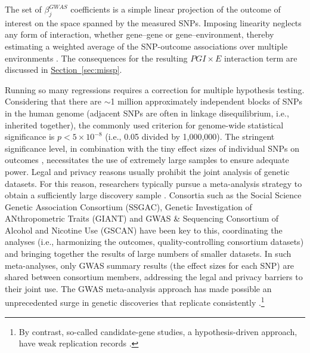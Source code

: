 \documentclass[12pt,a4paper]{article}
\begin{document}
\begin{bibunit}
The set of $\beta_j^{GWAS}$ coefficients is a simple linear projection of the outcome of interest on the space spanned by the measured SNPs. Imposing linearity neglects any form of interaction, whether gene--gene or gene--environment, thereby estimating a weighted average of the SNP-outcome associations over multiple environments \citep[e.g.,][]{loken2012linear}. The consequences for the resulting $PGI \times E$ interaction term are discussed in \hyperref[sec:missp]{Section~\ref*{sec:missp}}.

Running so many regressions requires a correction for multiple hypothesis testing. Considering that there are $\sim$1 million approximately independent blocks of SNPs in the human genome (adjacent SNPs are often in linkage disequilibrium, i.e., inherited together), the commonly used criterion for genome-wide statistical significance is $p <5 \times 10^{-8}$ (i.e., 0.05 divided by 1,000,000). The stringent significance level, in combination with the tiny effect sizes of individual SNPs on outcomes \citep{Rietveld2013,Chabris2015}, necessitates the use of extremely large samples to ensure adequate power. Legal and privacy reasons usually prohibit the joint analysis of genetic datasets. For this reason, researchers typically pursue a meta-analysis strategy to obtain a sufficiently large discovery sample \citep{Visscher2017}. Consortia such as the Social Science Genetic Association Consortium (SSGAC), Genetic Investigation of ANthropometric Traits (GIANT) and GWAS \& Sequencing Consortium of Alcohol and Nicotine Use (GSCAN) have been key to this, coordinating the analyses (i.e., harmonizing the outcomes, quality-controlling consortium datasets) and bringing together the results of large numbers of smaller datasets. In such meta-analyses, only GWAS summary results (the effect sizes for each SNP) are shared between consortium members, addressing the legal and privacy barriers to their joint use. 
The GWAS meta-analysis approach has made possible an unprecedented surge in genetic discoveries that replicate consistently \citep{Visscher2017}.\footnote{By contrast, so-called candidate-gene studies, a hypothesis-driven approach, have weak replication records \citep[see e.g.,][]{Hewitt2012,Chabris2013}. } 


\end{bibunit}
\end{document}
